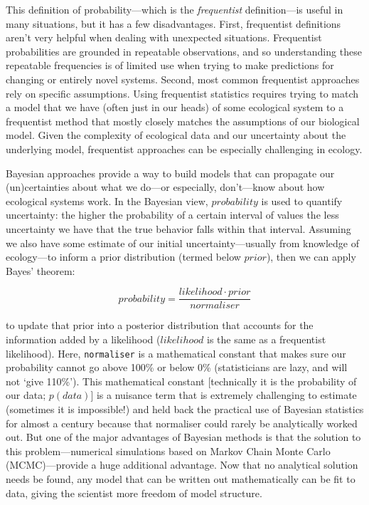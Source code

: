 \documentclass[11pt]{article}
\begin{document}
This definition of probability---which is the \emph{frequentist} definition---is useful in many situations, but it has a few disadvantages. First, frequentist definitions aren't very helpful when dealing with unexpected situations. Frequentist probabilities are grounded in repeatable observations, and so understanding these repeatable frequencies is of limited use when trying to make predictions for changing or entirely novel systems. Second, most common frequentist approaches rely on specific assumptions. Using frequentist statistics requires trying to match a model that we have (often just in our heads) of some ecological system to a frequentist method that mostly closely matches the assumptions of our biological model. Given the complexity of ecological data and our uncertainty about the underlying model, frequentist approaches can be especially challenging in ecology. 

Bayesian approaches provide a way to build models that can propagate our (un)certainties about what we do---or especially, don't---know about how ecological systems work. In the Bayesian view, $probability$ is used to quantify uncertainty: the higher the probability of a certain interval of values the less uncertainty we have that the true behavior falls within that interval. Assuming we also have some estimate of our initial uncertainty---usually from knowledge of ecology---to inform a prior distribution (termed below $prior$), then we can apply Bayes' theorem:

\begin{equation}
  probability = \frac{likelihood \cdot prior}{normaliser}
  \label{bayes_theorem}
\end{equation}

to update that prior into a posterior distribution that accounts for the information added by a likelihood ($likelihood$ is the same as a frequentist likelihood). Here, \texttt{normaliser} is a mathematical constant that makes sure our probability cannot go above 100\% or below 0\% (statisticians are lazy, and will not `give 110\%'). This mathematical constant [technically it is the probability of our data; $p(data)$] is a nuisance term that is extremely challenging to estimate (sometimes it is impossible!) and held back the practical use of Bayesian statistics for almost a century because that normaliser could rarely be analytically worked out. But one of the major advantages of Bayesian methods is that the solution to this problem---numerical simulations based on Markov Chain Monte Carlo (MCMC)---provide a huge additional advantage. Now that no analytical solution needs be found, any model that can be written out mathematically can be fit to data, giving the scientist more freedom of model structure.
\end{document}
